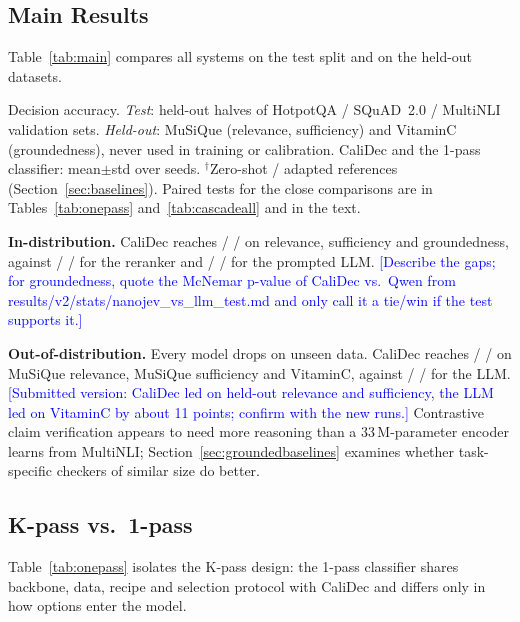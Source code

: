 \documentclass[twocolumn]{ICCKjournal}
\newcommand{\revnote}[1]{\textcolor{blue}{[#1]}}
\begin{document}
\subsection{Main Results}
\label{sec:mainresults}
Table~\ref{tab:main} compares all systems on the test split and on the held-out datasets.

\begin{table}[t]
\caption{Decision accuracy. \emph{Test}: held-out halves of HotpotQA / SQuAD~2.0 / MultiNLI validation sets. \emph{Held-out}: MuSiQue (relevance, sufficiency) and VitaminC (groundedness), never used in training or calibration. CaliDec and the 1-pass classifier: mean{\scriptsize$\pm$std} over \NSeeds{} seeds. $^\dagger$Zero-shot / adapted references (Section~\ref{sec:baselines}). Paired tests for the close comparisons are in Tables~\ref{tab:onepass} and~\ref{tab:cascadeall} and in the text.}
\label{tab:main}
\centering
\begin{adjustbox}{max width=\linewidth}

\end{adjustbox}
\end{table}

\textbf{In-distribution.} CaliDec reaches \NJRelTest{} / \NJSufTest{} / \NJGroTest{} on relevance, sufficiency and groundedness, against \BGERelTest{} / \BGESufTest{} / \BGEGroTest{} for the reranker and \LLMRelTest{} / \LLMSufTest{} / \LLMGroTest{} for the prompted LLM. \revnote{Describe the gaps; for groundedness, quote the McNemar p-value of CaliDec vs.\ Qwen from results/v2/stats/nanojev\_vs\_llm\_test.md and only call it a tie/win if the test supports it.}

\textbf{Out-of-distribution.} Every model drops on unseen data. CaliDec reaches \NJRelHeld{} / \NJSufHeld{} / \NJGroHeld{} on MuSiQue relevance, MuSiQue sufficiency and VitaminC, against \LLMRelHeld{} / \LLMSufHeld{} / \LLMGroHeld{} for the LLM. \revnote{Submitted version: CaliDec led on held-out relevance and sufficiency, the LLM led on VitaminC by about 11 points; confirm with the new runs.} Contrastive claim verification appears to need more reasoning than a 33\,M-parameter encoder learns from MultiNLI; Section~\ref{sec:groundedbaselines} examines whether task-specific checkers of similar size do better.

\subsection{K-pass vs.\ 1-pass}
\label{sec:onepass}
Table~\ref{tab:onepass} isolates the K-pass design: the 1-pass classifier shares backbone, data, recipe and selection protocol with CaliDec and differs only in how options enter the model.
\end{document}
